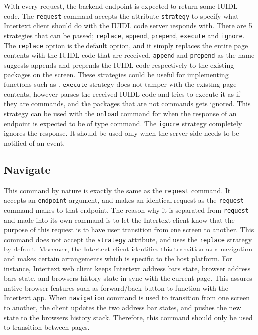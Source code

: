 With every request, the backend endpoint is expected to return some IUIDL code. The \texttt{request} command accepts the attribute \texttt{strategy} to specify what Intertext client should do with the IUIDL code server responds with. There are 5 strategies that can be passed; \texttt{replace}, \texttt{append}, \texttt{prepend}, \texttt{execute} and \texttt{ignore}. The \texttt{replace} option is the default option, and it simply replaces the entire page contents with the IUIDL code that are received. \texttt{append} and \texttt{prepend} as the name suggests appends and prepends the IUIDL code respectively to the existing packages on the screen. These strategies could be useful for implementing functions such as . \texttt{execute} strategy does not tamper with the existing page contents, however parses the received IUIDL code and tries to execute it as if they are commands, and the packages that are not commands gets ignored. This strategy can be used with the \texttt{onload} command for when the response of an endpoint is expected to be of type command. The \texttt{ignore} strategy completely ignores the response. It should be used only when the server-side needs to be notified of an event.

\subsection{Navigate}

This command by nature is exactly the same as the \texttt{request} command. It accepts an \texttt{endpoint} argument, and makes an identical request as the \texttt{request} command makes to that endpoint. The reason why it is separated from \texttt{request} and made into its own command is to let the Intertext client know that the purpose of this request is to have user transition from one screen to another. This command does not accept the \texttt{strategy} attribute, and uses the \texttt{replace} strategy by default. Moreover, the Intertext client identifies this transition as a navigation and makes certain arrangements which is specific to the host platform. For instance, Intertext web client keeps Intertext address bars state, browser address bars state, and browsers history state in sync with the current page. This assures native browser features such as forward/back button to function with the Intertext app. When \texttt{navigation} command is used to transition from one screen to another, the client updates the two address bar states, and pushes the new state to the browsers history stack. Therefore, this command should only be used to transition between pages.
